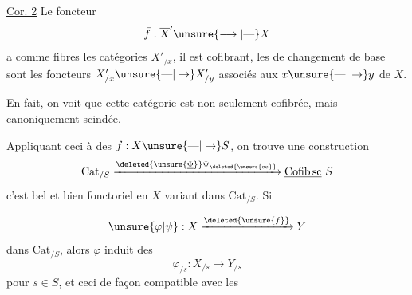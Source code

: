 
\uline{Cor. 2} Le foncteur
\[ \bar f:\overline{X}'\unsure{\longrightarrow|\text{---}}X \]
a comme fibres les catégories $X'_{/x}$, il est cofibrant, les   de changement de base sont les foncteurs $X'_{/x}\unsure{\text{---}|\to}X'_{/y}$ associés aux   $x\unsure{\text{---}|\to}y$ de $X$.

En fait, on voit que cette catégorie est non seulement cofibrée, mais canoniquement \uline{scindée}. 

Appliquant ceci à des $f:X\unsure{\text{---}|\to}S$, on trouve une construction
\[ \mathrm{Cat}_{/S}\xrightarrow{\deleted{\unsure{\underline{\Phi}}}\Psi_{\deleted{\unsure{\mathrm{sc}}}}}\underline{\mathrm{Cofib}\,\mathrm{sc}}\ S \]
c'est bel et bien fonctoriel en $X$ variant dans $\mathrm{Cat}_{/S}$. Si 

\[ \unsure{\varphi|\psi}:X\xrightarrow{\deleted{\unsure{f}}}Y \]
dans $\mathrm{Cat}_{/S}$, alors $\varphi$ induit des
\[ \varphi_{/s}:X_{/s}\longrightarrow Y_{/s} \]
pour $s\in S$, et ceci de façon compatible avec les

